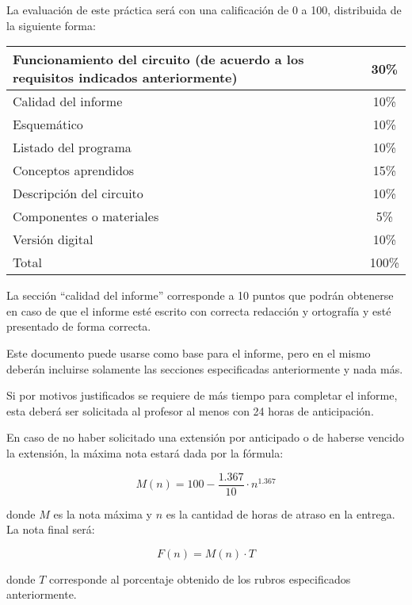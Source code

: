 \documentclass[12pt,letterpaper]{IEEEtran}
\begin{document}
La evaluación de este práctica será con una calificación de 0 a 100, distribuida de la siguiente forma:

\begin{center}
 \begin{tabular}{p{}|c}\hline
   Funcionamiento del circuito (de acuerdo a los requisitos indicados anteriormente) 					     & 30\% \\\hline
   Calidad del informe	  				& 10\% \\\hline
   Esquemático							& 10\% \\\hline
   Listado del programa					& 10\% \\\hline
   Conceptos aprendidos					& 15\% \\\hline
   Descripción del circuito				& 10\% \\\hline
   Componentes o materiales				& 5\% \\\hline
   Versión digital						& 10\% \\\hline\hline
   Total								& 100\% \\
 \end{tabular}
\end{center}

La sección ``calidad del informe'' corresponde a 10 puntos que podrán obtenerse en caso de que el informe esté escrito con correcta redacción y ortografía y esté presentado de forma correcta.

Este documento puede usarse como base para el informe, pero en el mismo deberán incluirse solamente las secciones especificadas anteriormente y nada más.

Si por motivos justificados se requiere de más tiempo para completar el informe, esta deberá ser solicitada al profesor al menos con 24 horas de anticipación.

En caso de no haber solicitado una extensión por anticipado o de haberse vencido la extensión, la máxima nota estará dada por la fórmula:

\[ M(n) = 100-\frac{1.367}{10}\cdot n^{1.367} \]

donde $M$ es la nota máxima y $n$ es la cantidad de horas de atraso en la entrega. La nota final será:

\[ F(n) = M(n)\cdot T \]

donde $T$ corresponde al porcentaje obtenido de los rubros especificados anteriormente.
\end{document}

